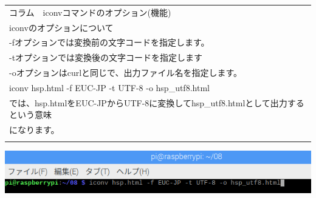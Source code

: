 





\begin{table}[htbp]
    \centering
    \begin{tabular}{|l|}
        \hline
        コラム　iconvコマンドのオプション(機能)　\\
        iconvのオプションについて\\

        {}-fオプションでは変換前の文字コードを指定します。\\

        {}-tオプションでは変換後の文字コードを指定します\\

        {}-oオプションはcurlと同じで、出力ファイル名を指定します。\\

        iconv hsp.html -f EUC-JP -t UTF-8 -o hsp\_utf8.html\\

        では、hsp.htmlをEUC-JPからUTF-8に変換してhsp\_utf8.htmlとして出力するという意味\\
        になります。\\
        \\\hline
    \end{tabular}
\end{table}






\begin{center}
\includegraphics[width=\textwidth]{./text08-img/textbook-img022.png}

\end{center}

